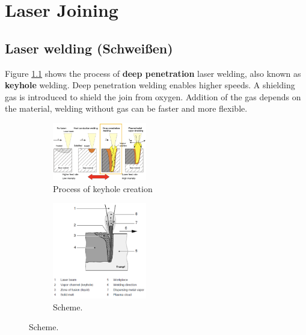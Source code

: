 \chapter{Laser Joining}
\section{Laser welding (Schweißen)}


Figure \ref{fig:energy} shows the process of \textbf{deep penetration} laser welding, also known as \textbf{keyhole} welding. 
Deep penetration welding enables higher speeds.  A shielding gas is introduced to shield the join from oxygen. Addition of the gas
depends on the material, welding without gas can be faster and more flexible. 



\begin{figure}[h!]
    \centering
    \begin{subfigure}[b]{0.45\textwidth}
        \centering
        \includegraphics[width=0.45\textwidth]{slike/energy.png}
        \caption{Process of keyhole creation}
        \label{fig:energy}
    \end{subfigure}

    \begin{subfigure}[b]{0.45\textwidth}
        \centering
        \includegraphics[width=0.45\textwidth]{slike/keyhole_parts.png}
        \caption{Scheme.\sln}
        \label{fig:KHparts}
    \end{subfigure}
\end{figure}


